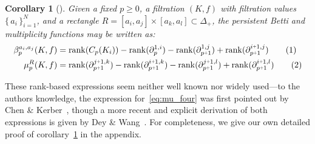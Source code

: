 \documentclass[10pt]{article}
\numberwithin{equation}{section}
\newcommand{\+}{%
	\raisebox{0.18ex}{\scaleobj{0.55}{+}}
}
\newtheorem{proposition}{Proposition}
\newtheorem{corollary}{Corollary}
\theoremstyle{definition}
\theoremstyle{definition}
\newcommand\numberthis{\addtocounter{equation}{1}\tag{\theequation}}
\begin{document}
\begin{corollary}[\cite{chen2011output, dey2022computational}]\label{cor:rank_reduction}
Given a fixed $p \geq 0$, a filtration $(K,f)$ with filtration values $\{ \, a_i \, \}_{i=1}^N$, and a rectangle $R =  [a_i,a_j] \times [a_k,a_l] \subset \Delta_+$,
the persistent Betti and multiplicity functions may be written as:
	\begin{align*}\label{eq:betti_four}
	\beta_p^{a_i,a_j}(K,f) &= \mathrm{rank}(C_p(K_i)) - \mathrm{rank}(\partial_p^{1,i}) - \mathrm{rank}(\partial_{p\+1 }^{1,j}) + \mathrm{rank}(\partial_{p\+1}^{i \+ 1, j} ) \numberthis  \\
	\mu_p^{R}(K, f) &= \mathrm{rank}(\partial_{p\+1}^{j \+ 1, k})  - \mathrm{rank}(\partial_{p\+1}^{i \+ 1, k})  - \mathrm{rank}(\partial_{p\+1}^{j \+ 1, l}) + \mathrm{rank}(\partial_{p\+1}^{i \+ 1, l}) \numberthis \label{eq:mu_four}
	\end{align*}
\end{corollary}
\noindent These rank-based expressions seem neither well known nor widely used---to the authors knowledge, the expression for~\eqref{eq:mu_four} was first pointed out by Chen \& Kerber~\cite{chen2011output}, though a more recent and explicit derivation of both expressions is given by Dey \& Wang~\cite{dey2022computational}. For completeness, we give our own detailed proof of corollary~\ref{cor:rank_reduction} in the appendix. 

\end{document}
